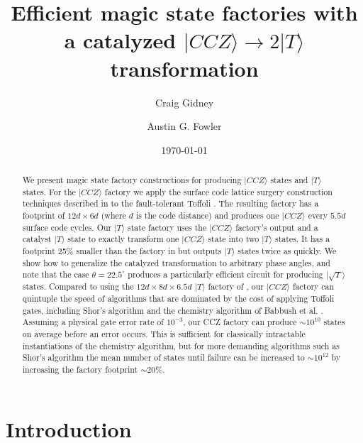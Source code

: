 \documentclass[twocolumn,accepted=2019-03-30]{quantumarticle}
\begin{document}
\title{\texorpdfstring{
Efficient magic state factories with a catalyzed $|CCZ\rangle \rightarrow 2|T\rangle$ transformation
}{
Efficient magic state factories with a catalyzed CCZ to 2T transformation
}}

\date{\today}
\author{Craig Gidney}
\author{Austin G. Fowler}

\begin{abstract}
We present magic state factory constructions for producing $|CCZ\rangle$ states and $|T\rangle$ states.
For the $|CCZ\rangle$ factory we apply the surface code lattice surgery construction techniques described in \cite{fowler2018} to the fault-tolerant Toffoli \cite{jones2013, eastin2013distilling}.
The resulting factory has a footprint of $12d \times 6d$ (where $d$ is the code distance) and produces one $|CCZ\rangle$ every $5.5d$ surface code cycles.
Our $|T\rangle$ state factory uses the $|CCZ\rangle$ factory's output and a catalyst $|T\rangle$ state to exactly transform one $|CCZ\rangle$ state into two $|T\rangle$ states.
It has a footprint 25\% smaller than the factory in \cite{fowler2018} but outputs $|T\rangle$ states twice as quickly.
We show how to generalize the catalyzed transformation to arbitrary phase angles, and note that the case $\theta=22.5^\circ$ produces a particularly efficient circuit for producing $|\sqrt{T}\rangle$ states.
Compared to using the $12d \times 8d \times 6.5d$ $|T\rangle$ factory of \cite{fowler2018}, our $|CCZ\rangle$ factory can quintuple the speed of algorithms that are dominated by the cost of applying Toffoli gates, including Shor's algorithm \cite{shor1994} and the chemistry algorithm of Babbush et al. \cite{babbush2018}.
Assuming a physical gate error rate of $10^{-3}$, our CCZ factory can produce $\sim 10^{10}$ states on average before an error occurs.
This is sufficient for classically intractable instantiations of the chemistry algorithm, but for more demanding algorithms such as Shor's algorithm the mean number of states until failure can be increased to $\sim 10^{12}$ by increasing the factory footprint $\sim 20\%$.
\end{abstract}

\maketitle


\section{Introduction}
\label{sec:introduction}
\end{document}
